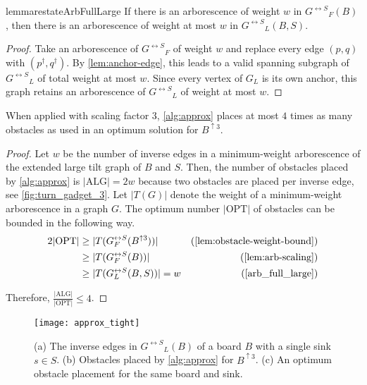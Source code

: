 \documentclass[a4paper,UKenglish,cleveref,thm-restate]{lipics-v2021}
\newcommand{\bScale}[2][k]{\ensuremath{{#2}^{\uparrow {#1}}}}
\newcommand{\gExt}[1][G]{\ensuremath{{#1}^{\leftrightarrow S}}}
\begin{document}
\begin{restatable}{lemma}{restateArbFullLarge}\label{arb_full_large}
If there is an arborescence of weight $w$ in $\gExt_F(B)$, then there is an
arborescence of weight at most $w$ in $\gExt_L(B,S)$.
\end{restatable}
\begin{proof}
    Take an arborescence of $\gExt_F$ of weight $w$ and replace every edge $(p,q)$
    with $(p^\dagger,q^\dagger)$. By \cref{lem:anchor-edge}, this leads to a valid
    spanning subgraph of $\gExt_L$ of total weight at most $w$. Since every vertex
    of $G_L$ is its own anchor, this graph retains an arborescence of $\gExt_L$ of
    weight at most $w$.
\end{proof}

\begin{theorem}\label{approx_ratio}
When applied with scaling factor $3$, \cref{alg:approx} places at most $4$
times as many obstacles as used in an optimum solution for $\bScale[3]{B}$.
\end{theorem}
\begin{proof}
Let $w$ be the number of inverse edges in a minimum-weight arborescence of the
extended large tilt graph of $B$ and $S$. Then, the number of obstacles placed
by \cref{alg:approx} is \(|\text{ALG}| = 2w\) because two obstacles are placed
per inverse edge, see \cref{fig:turn_gadget_3}. Let $|T(G)|$ denote the weight
of a minimum-weight arborescence in a graph $G$. The optimum number
$|\text{OPT}|$ of obstacles can be bounded in the following way.
\begin{align*}
  2|\text{OPT}| & \ge |T(\gExt_F(\bScale[3]{B}))|
    & \text{(\cref{lem:obstacle-weight-bound})} \\
  & \ge |T(\gExt_F(B))| & \text{(\cref{lem:arb-scaling})} \\
  & \ge |T(\gExt_L(B, S))| = w
    & \text{(\cref{arb_full_large})}
\end{align*}

Therefore, \(\frac{|\text{ALG}|}{|\text{OPT}|} \le 4\).
\end{proof}

\begin{figure}[htb]
\centering
\texttt{[image: approx\_tight]}\caption{(a) The inverse edges in $\gExt_L(B)$ of a board $B$ with a single sink
$s \in S$. (b) Obstacles placed by \cref{alg:approx} for $\bScale[3]{B}$.
(c) An optimum obstacle placement for the same board and sink.}\label{fig:approx_tight}
\end{figure}
\end{document}
